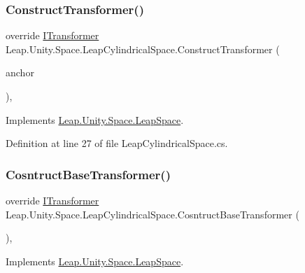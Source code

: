 \subsubsection{\texorpdfstring{ConstructTransformer()}{ConstructTransformer()}}
{\footnotesize\ttfamily override \mbox{\hyperlink{interface_leap_1_1_unity_1_1_space_1_1_i_transformer}{I\+Transformer}} Leap.\+Unity.\+Space.\+Leap\+Cylindrical\+Space.\+Construct\+Transformer (\begin{DoxyParamCaption}\item[{\mbox{\hyperlink{class_leap_1_1_unity_1_1_space_1_1_leap_space_anchor}{Leap\+Space\+Anchor}}}]{anchor }\end{DoxyParamCaption})\hspace{0.3cm}{\ttfamily [protected]}, {\ttfamily [virtual]}}



Implements \mbox{\hyperlink{class_leap_1_1_unity_1_1_space_1_1_leap_space_af6ff18ae47b473989e65d321da089948}{Leap.\+Unity.\+Space.\+Leap\+Space}}.



Definition at line 27 of file Leap\+Cylindrical\+Space.\+cs.

\mbox{\label{class_leap_1_1_unity_1_1_space_1_1_leap_cylindrical_space_a65ae2afb61d3f9fe727a5a08dcc6a2ec}} 
\subsubsection{\texorpdfstring{CosntructBaseTransformer()}{CosntructBaseTransformer()}}
{\footnotesize\ttfamily override \mbox{\hyperlink{interface_leap_1_1_unity_1_1_space_1_1_i_transformer}{I\+Transformer}} Leap.\+Unity.\+Space.\+Leap\+Cylindrical\+Space.\+Cosntruct\+Base\+Transformer (\begin{DoxyParamCaption}{ }\end{DoxyParamCaption})\hspace{0.3cm}{\ttfamily [protected]}, {\ttfamily [virtual]}}



Implements \mbox{\hyperlink{class_leap_1_1_unity_1_1_space_1_1_leap_space_a344e65e7be98cd41ba6c6804b283f681}{Leap.\+Unity.\+Space.\+Leap\+Space}}.



